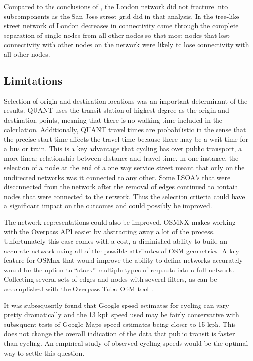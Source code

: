 Compared to the conclusions of \textcite{furth2016networks}, the London network did not fracture into subcomponents as the San Jose street grid did in that analysis. In the tree-like street network of London decreases in connectivity came through the complete separation of single nodes from all other nodes so that most nodes that lost connectivity with other nodes on the network were likely to lose connectivity with all other nodes. 

\subsection{Limitations}

Selection of origin and destination locations was an important determinant of the results. QUANT uses the transit station of highest degree as the origin and destination points, meaning that there is no walking time included in the calculation. Additionally, QUANT travel times are probabilistic in the sense that the precise start time affects the travel time because there may be a wait time for a bus or train. This is a key advantage that cycling has over public transport, a more linear relationship between distance and travel time. In one instance, the selection of a node at the end of a one way service street meant that only on the undirected networks was it connected to any other. Some LSOA's that were disconnected from the network after the removal of edges continued to contain nodes that were connected to the network. Thus the selection criteria could have a significant impact on the outcomes and could possibly be improved. 

The network representations could also be improved. OSMNX makes working with the Overpass API easier by abstracting away a lot of the process. Unfortunately this ease comes with a cost, a diminished ability to build an accurate network using all of the possible attributes of OSM geometries. A key feature for OSMnx that would improve the ability to define networks accurately would be the option to ``stack'' multiple types of requests into a full network. Collecting several sets of edges and nodes with several filters, as can be accomplished with the Overpass Tubo OSM tool \parencite{overpass_turbo}. 


It was subsequently found that Google speed estimates for cycling can vary pretty dramatically and the 13 kph speed used may be fairly conservative with subsequent tests of Google Maps speed estimates being closer to 15 kph. This does not change the overall indication of the data that public transit is faster than cycling. An empirical study of observed cycling speeds would be the optimal way to settle this question. 

